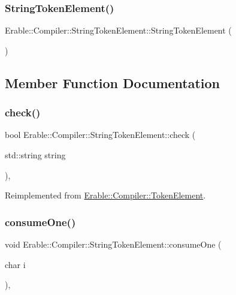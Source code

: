 \subsubsection{\texorpdfstring{StringTokenElement()}{StringTokenElement()}}
{\footnotesize\ttfamily Erable\+::\+Compiler\+::\+String\+Token\+Element\+::\+String\+Token\+Element (\begin{DoxyParamCaption}{ }\end{DoxyParamCaption})}



\subsection{Member Function Documentation}
\mbox{\label{class_erable_1_1_compiler_1_1_string_token_element_a25c4ee04b4aac868110d5a7d6fa6e965}} 
\subsubsection{\texorpdfstring{check()}{check()}}
{\footnotesize\ttfamily bool Erable\+::\+Compiler\+::\+String\+Token\+Element\+::check (\begin{DoxyParamCaption}\item[{std\+::string}]{string }\end{DoxyParamCaption})\hspace{0.3cm}{\ttfamily [override]}, {\ttfamily [virtual]}}



Reimplemented from \mbox{\hyperlink{class_erable_1_1_compiler_1_1_token_element_a939f70ed141904d769b6d9f6ecf39cb1}{Erable\+::\+Compiler\+::\+Token\+Element}}.

\mbox{\label{class_erable_1_1_compiler_1_1_string_token_element_a8db2f3d10cc46b873ccfb7db8c90c709}} 
\subsubsection{\texorpdfstring{consumeOne()}{consumeOne()}}
{\footnotesize\ttfamily void Erable\+::\+Compiler\+::\+String\+Token\+Element\+::consume\+One (\begin{DoxyParamCaption}\item[{char}]{i }\end{DoxyParamCaption})\hspace{0.3cm}{\ttfamily [override]}, {\ttfamily [virtual]}}



